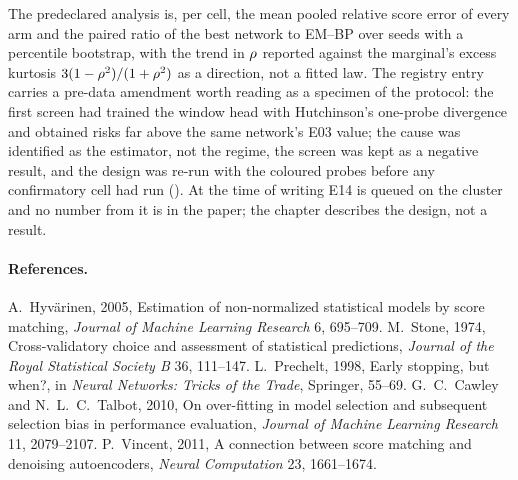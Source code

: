 The predeclared analysis is, per cell, the mean pooled relative score error of every arm
and the paired ratio of the best network to EM--BP over seeds with a percentile
bootstrap, with the trend in $\rho$ reported against the marginal's excess kurtosis
$3(1-\rho^2)/(1+\rho^2)$ as a direction, not a fitted law. The registry entry carries a
pre-data amendment worth reading as a specimen of the protocol: the first screen had
trained the window head with Hutchinson's one-probe divergence and obtained risks far
above the same network's E03 value; the cause was identified as the estimator, not the
regime, the screen was kept as a negative result, and the design was re-run with the
coloured probes before any confirmatory cell had run (). At the time
of writing E14 is queued on the cluster and no number from it is in the paper; the
chapter describes the design, not a result.


\paragraph{References.}
A.~Hyv\"arinen, 2005, Estimation of non-normalized statistical models by score matching, \emph{Journal of Machine Learning Research} 6, 695--709.
M.~Stone, 1974, Cross-validatory choice and assessment of statistical predictions, \emph{Journal of the Royal Statistical Society B} 36, 111--147.
L.~Prechelt, 1998, Early stopping, but when?, in \emph{Neural Networks: Tricks of the Trade}, Springer, 55--69.
G.~C.~Cawley and N.~L.~C.~Talbot, 2010, On over-fitting in model selection and subsequent selection bias in performance evaluation, \emph{Journal of Machine Learning Research} 11, 2079--2107.
P.~Vincent, 2011, A connection between score matching and denoising autoencoders, \emph{Neural Computation} 23, 1661--1674.
